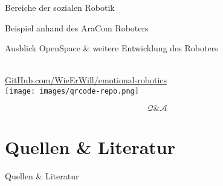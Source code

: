 \documentclass[aspectratio=169]{beamer}
\begin{document}
\begin{frame}{Bereiche der sozialen Robotik}

\end{frame}
\begin{frame}{Beispiel anhand des AraCom Roboters}

\end{frame}
\begin{frame}{Ausblick OpenSpace \& weitere Entwicklung des Roboters}

\end{frame}

\begin{frame}[c]{}
  \centering
  \begin{minipage}{\textwidth}
    \centering
    \Large {}\\
    \href{https://github.com/wieerwill/emotional-robotics}{GitHub.com/WieErWill/emotional-robotics}\\
    \vspace{.4cm}
    \texttt{[image: images/qrcode-repo.png]}
  \end{minipage}
\end{frame}

\begin{frame}[c]{}
  \centering
  \begin{minipage}{\textwidth}
    \centering
    \Huge \[\mathcal Q \& \mathcal A\]
    \Large {}
  \end{minipage}
\end{frame}

\section{Quellen \& Literatur}
\begin{frame}[allowframebreaks]{Quellen \& Literatur}
  \scriptsize
  
  
\end{frame}
\end{document}
